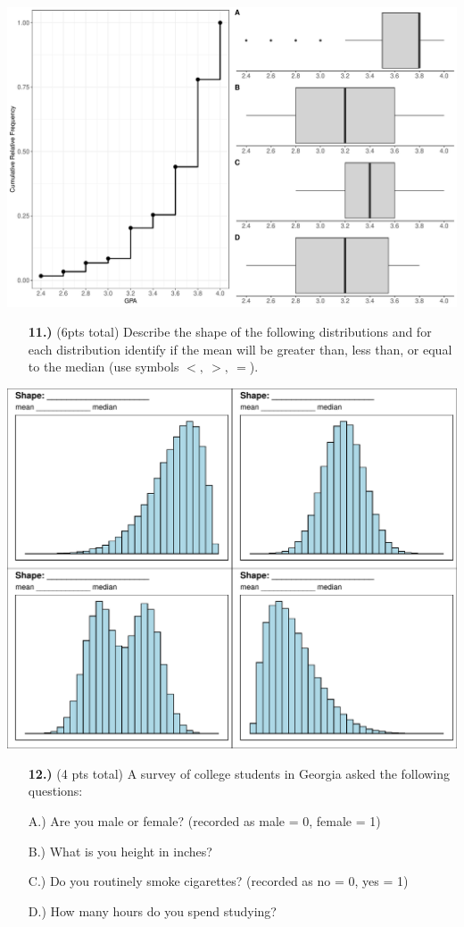 \documentclass[
]{article}
\begin{document}
\includegraphics{Exam_1_Version_B_files/figure-latex/unnamed-chunk-2-1.pdf}

\newpage

\begin{enumerate}
\item[\bf 11.)] (6pts total) Describe the shape of the following distributions and for each distribution identify if the mean will be greater than, less than, or equal to the median (use symbols $<, \ >, \ =$).
\end{enumerate}

\includegraphics{Exam_1_Version_B_files/figure-latex/unnamed-chunk-3-1.pdf}

\newpage
\begin{enumerate}
\item[\bf 12.)] (4 pts total) A survey of college students in Georgia asked the following questions:
\item[A.)] Are you male or female? (recorded as male = 0, female = 1)
\item[B.)] What is you height in inches?
\item[C.)] Do you routinely smoke cigarettes? (recorded as no = 0, yes = 1)
\item[D.)] How many hours do you spend studying?
\end{enumerate}
\end{document}
